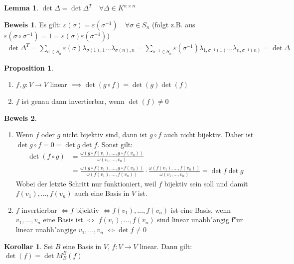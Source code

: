 \documentclass[oneside,fontsize=11pt,paper=a4,BCOR=0mm,DIV=12,automark,headsepline]{scrbook}
\theoremstyle{remark}
\theoremstyle{definition}
\newtheorem*{proposition}{Proposition}
\newtheorem{lemma}{Lemma}[section]
\newtheorem*{korollar}{Korollar}
\theoremstyle{definition}
\newtheorem*{prof}{Beweis}
\theoremstyle{remark}
\begin{document}
\begin{lemma}
  \(\det\Delta = \det\Delta^T\quad\forall \Delta\in K^{n\times n}\)
\end{lemma}
\begin{prof}
  Es gilt: \(\varepsilon(\sigma) = \varepsilon(\sigma^{-1})\quad\forall \sigma\in S_n \) (folgt z.B. aus \(\varepsilon(\sigma\circ\sigma^{-1})=1=\varepsilon(\sigma)\varepsilon(\sigma^{-1})\))
  \begin{align*}
    \det\Delta^T = \sum_{\sigma\in S_n}\varepsilon(\sigma)\lambda_{\sigma(1),1}\dots\lambda_{\sigma(n),n} = \sum_{\sigma^{-1}\in S_n}\varepsilon(\sigma^{-1})\lambda_{1,\sigma^{-1}(1)}\dots\lambda_{n,\sigma^{-1}(n)} = \det \Delta
  \end{align*}
\end{prof}
\begin{proposition}
  \begin{enumerate}
  \item \(f, g: V\to V \) linear \(\implies\det(g\circ f) = \det(g)\det(f) \)
  \item \(f\) ist genau dann invertierbar, wenn \(\det(f)\neq 0 \)
  \end{enumerate}
\end{proposition}
\begin{prof}
  \begin{enumerate}
  \item Wenn \(f\) oder \(g\) nicht bijektiv sind, dann ist \(g\circ f\) auch nicht bijektiv. Daher ist \(\det g\circ f = 0 = \det g \det f\). Sonst gilt:
    \begin{align*}
      \det (f\circ g) &= \frac{\omega (g\circ f(v_1), \dots, g\circ f(v_n))}{\omega (v_1, \dots, v_n)} \\
                      &= \frac{\omega (g\circ f(v_1), \dots, g\circ f(v_n))}{\omega (f(v_1), \dots, f(v_n))}\cdot\frac{\omega (f(v_1), \dots, f(v_n))}{\omega (v_1,\dots ,v_n)} = \det f\det g
    \end{align*}
    Wobei der letzte Schritt nur funktioniert, weil \(f\) bijektiv sein soll und damit \(f(v_1), \dots ,f(v_n)\) auch eine Basis in \(V\) ist.
  \item \(f\) invertierbar \(\iff f\) bijektiv \(\iff f(v_1), \dots, f(v_n)\) ist eine Basis, wenn \(v_1, \dots, v_n\) eine Basis ist \(\iff\) \(f(v_1), \dots, f(v_n)\) sind linear unabh"angig f"ur linear unabh"angige \(v_1,\dots, v_n\) \(\iff \det f \neq 0\)
  \end{enumerate}
\end{prof}
\begin{korollar}
  Sei \(B\) eine Basis in \(V\), \(f:V\to V \) linear. Dann gilt: \(\det(f) = \det M^B_B(f) \)
\end{korollar}
\end{document}
